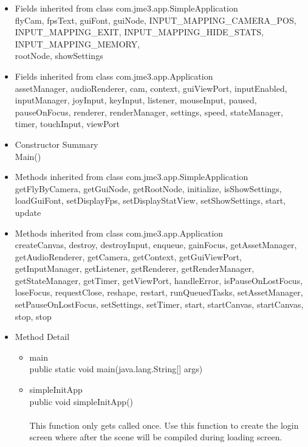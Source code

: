 \documentclass[letterpaper]{article}
\begin{document}
\begin{itemize}
									\item	Fields inherited from class com.jme3.app.SimpleApplication \\
											flyCam, fpsText, guiFont, guiNode, INPUT\_MAPPING\_CAMERA\_POS, \\ INPUT\_MAPPING\_EXIT, INPUT\_MAPPING\_HIDE\_STATS, INPUT\_MAPPING\_MEMORY, \\ rootNode, showSettings
									\item	Fields inherited from class com.jme3.app.Application \\
											assetManager, audioRenderer, cam, context, guiViewPort, inputEnabled, inputManager, joyInput, keyInput, listener, mouseInput, paused, pauseOnFocus, renderer, renderManager, settings, speed, stateManager, timer, touchInput, viewPort
									\item	Constructor Summary \\
											Main()
									\item	Methods inherited from class com.jme3.app.SimpleApplication \\
											getFlyByCamera, getGuiNode, getRootNode, initialize, isShowSettings, loadGuiFont, setDisplayFps, setDisplayStatView, setShowSettings, start, update
									\item	Methods inherited from class com.jme3.app.Application \\
											createCanvas, destroy, destroyInput, enqueue, gainFocus, getAssetManager, getAudioRenderer, getCamera, getContext, getGuiViewPort, getInputManager, getListener, getRenderer, getRenderManager, getStateManager, getTimer, getViewPort, handleError, isPauseOnLostFocus, loseFocus, requestClose, reshape, restart, runQueuedTasks, setAssetManager, setPauseOnLostFocus, setSettings, setTimer, start, startCanvas, startCanvas, stop, stop
									\item	Method Detail
											\begin{itemize}
												\item	main \\
														public static void main(java.lang.String[] args)
												\item	simpleInitApp \\
														public void simpleInitApp() \\ \\
														This function only gets called once. Use this function to create the login screen where after the scene will be compiled during loading screen. \\ \\

\end{itemize}
\end{itemize}
\end{document}
